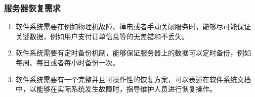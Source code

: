     \begin{frame}
        \frametitle{服务器恢复需求}
        \begin{enumerate}
            \item 软件系统需要在例如物理机故障、掉电或者手动关闭服务时，能够尽可能保证关键数据，例如用户支付订单信息等的无差错和不丢失。
            \item 软件系统需要有定时备份机制，能够保证服务器上的数据可以定时备份，例如每周、每日或者每小时备份一次。 
            \item 软件系统需要有一个完整并且可操作性的恢复方案，可以表述在软件系统文档中，以能够在实际系统发生故障时，指导维护人员进行恢复操作。
        \end{enumerate}
    \end{frame}


